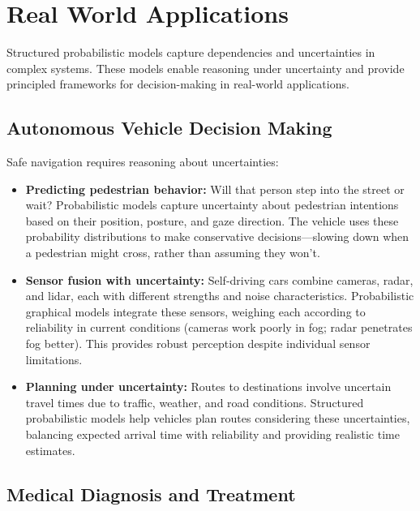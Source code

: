 
\section{Real World Applications}
\label{sec:structured-prob-real-world}


Structured probabilistic models capture dependencies and uncertainties in complex systems. These models enable reasoning under uncertainty and provide principled frameworks for decision-making in real-world applications.

\subsection{Autonomous Vehicle Decision Making}

Safe navigation requires reasoning about uncertainties:

\begin{itemize}
    \item \textbf{Predicting pedestrian behavior:} Will that person step into the street or wait? Probabilistic models capture uncertainty about pedestrian intentions based on their position, posture, and gaze direction. The vehicle uses these probability distributions to make conservative decisions—slowing down when a pedestrian might cross, rather than assuming they won't.
    
    \item \textbf{Sensor fusion with uncertainty:} Self-driving cars combine cameras, radar, and lidar, each with different strengths and noise characteristics. Probabilistic graphical models integrate these sensors, weighing each according to reliability in current conditions (cameras work poorly in fog; radar penetrates fog better). This provides robust perception despite individual sensor limitations.
    
    \item \textbf{Planning under uncertainty:} Routes to destinations involve uncertain travel times due to traffic, weather, and road conditions. Structured probabilistic models help vehicles plan routes considering these uncertainties, balancing expected arrival time with reliability and providing realistic time estimates.
\end{itemize}

\subsection{Medical Diagnosis and Treatment}

